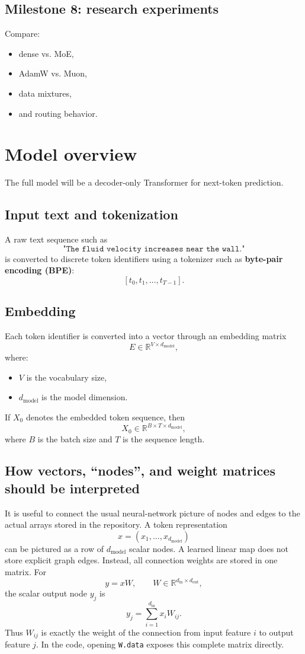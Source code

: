 \documentclass[11pt]{article}
\begin{document}
\subsection*{Milestone 8: research experiments}
Compare:
\begin{itemize}[leftmargin=1.5em]
    \item dense vs. MoE,
    \item AdamW vs. Muon,
    \item data mixtures,
    \item and routing behavior.
\end{itemize}

\section{Model overview}

The full model will be a decoder-only Transformer for next-token prediction.

\subsection{Input text and tokenization}
A raw text sequence such as
\[
\texttt{"The fluid velocity increases near the wall."}
\]
is converted to discrete token identifiers using a tokenizer such as \textbf{byte-pair encoding (BPE)}:
\[
[t_0, t_1, \dots, t_{T-1}].
\]

\subsection{Embedding}
Each token identifier is converted into a vector through an embedding matrix
\[
E \in \mathbb{R}^{V \times d_{\text{model}}},
\]
where:
\begin{itemize}[leftmargin=1.5em]
    \item \(V\) is the vocabulary size,
    \item \(d_{\text{model}}\) is the model dimension.
\end{itemize}
If \(X_0\) denotes the embedded token sequence, then
\[
X_0 \in \mathbb{R}^{B \times T \times d_{\text{model}}},
\]
where \(B\) is the batch size and \(T\) is the sequence length.

\subsection{How vectors, ``nodes'', and weight matrices should be interpreted}

It is useful to connect the usual neural-network picture of nodes and edges to the
actual arrays stored in the repository. A token representation
\[
x=(x_1,\ldots,x_{d_{\mathrm{model}}})
\]
can be pictured as a row of $d_{\mathrm{model}}$ scalar nodes. A learned linear
map does not store explicit graph edges. Instead, all connection weights are
stored in one matrix. For
\[
y=xW,\qquad W\in\mathbb{R}^{d_{\mathrm{in}}\times d_{\mathrm{out}}},
\]
the scalar output node $y_j$ is
\[
y_j=\sum_{i=1}^{d_{\mathrm{in}}}x_iW_{ij}.
\]
Thus $W_{ij}$ is exactly the weight of the connection from input feature $i$ to
output feature $j$. In the code, opening \texttt{W.data} exposes this complete
matrix directly.
\end{document}
